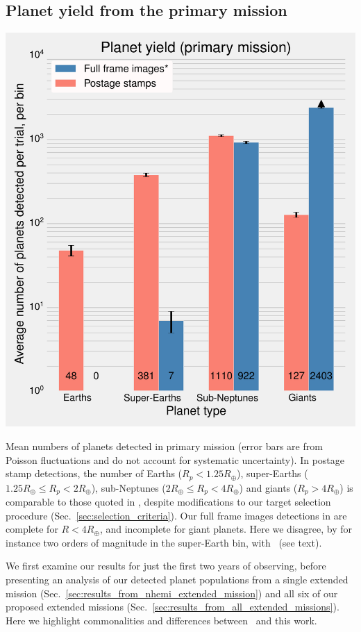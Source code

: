 \subsection{Planet yield from the primary mission}
\label{sec:results_from_primary_missions}
\begin{marginfigure} %
	\centering
	\includegraphics[width=\textwidth]{figures/160729_pm0_shemi_nhemi_nhemi_t20-pri-yield.pdf}
	\caption{Mean numbers of planets detected in \tesss primary mission (error bars are from Poisson fluctuations and do not account for systematic uncertainty). 
		In postage stamp detections, the number of Earths ($R_p < 1.25R_\oplus$), super-Earths ($1.25R_\oplus \le R_p < 2R_\oplus$), sub-Neptunes ($2R_\oplus \le R_p < 4R_\oplus$) and giants ($R_p > 4R_\oplus$) is comparable to those quoted in \protect\citet{Sullivan_2015}, despite modifications to our target selection procedure (Sec.~\protect\ref{sec:selection_criteria}).
		Our full frame images detections in are complete for $R < 4R_\oplus$, and incomplete for giant planets. 
		Here we disagree, by for instance two orders of magnitude in the super-Earth bin, with~\protect\citet{Sullivan_2015} (see text). }
	\label{fig:primary_planet_yield}
\end{marginfigure}
We first examine our results for just the first two years of \tesss observing, before presenting an analysis of our detected planet populations from a single extended mission (Sec.~\ref{sec:results_from_nhemi_extended_mission}) and all six of our proposed extended missions (Sec.~\ref{sec:results_from_all_extended_missions}).
Here we highlight commonalities and differences between~ and this work.

